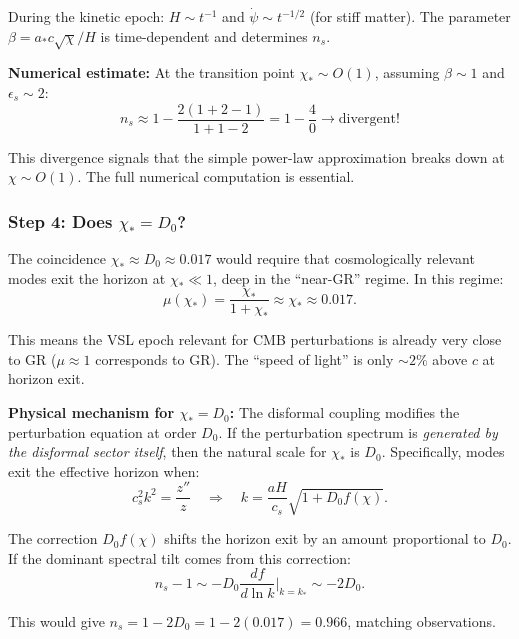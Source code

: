\documentclass[11pt,a4paper]{article}
\begin{document}
During the kinetic epoch: $H \sim t^{-1}$ and $\dot\psi \sim t^{-1/2}$ (for stiff matter). The parameter $\beta = a_* c\sqrt{\chi}/H$ is time-dependent and determines $n_s$.

\textbf{Numerical estimate:} At the transition point $\chi_* \sim O(1)$, assuming $\beta \sim 1$ and $\epsilon_s \sim 2$:
\begin{equation}
n_s \approx 1 - \frac{2(1 + 2 - 1)}{1 + 1 - 2} = 1 - \frac{4}{0} \to \text{divergent!}
\end{equation}

This divergence signals that the simple power-law approximation breaks down at $\chi \sim O(1)$. The full numerical computation is essential.

\subsubsection{Step 4: Does $\chi_* = D_0$?}

The coincidence $\chi_* \approx D_0 \approx 0.017$ would require that cosmologically relevant modes exit the horizon at $\chi_* \ll 1$, deep in the ``near-GR'' regime. In this regime:
\begin{equation}
\mu(\chi_*) = \frac{\chi_*}{1+\chi_*} \approx \chi_* \approx 0.017.
\end{equation}

This means the VSL epoch relevant for CMB perturbations is already very close to GR ($\mu \approx 1$ corresponds to GR). The ``speed of light'' is only $\sim 2\%$ above $c$ at horizon exit.

\textbf{Physical mechanism for $\chi_* = D_0$:} The disformal coupling modifies the perturbation equation at order $D_0$. If the perturbation spectrum is \emph{generated by the disformal sector itself}, then the natural scale for $\chi_*$ is $D_0$. Specifically, modes exit the effective horizon when:
\begin{equation}
c_s^2 k^2 = \frac{z''}{z} \quad \Rightarrow \quad k = \frac{aH}{c_s}\sqrt{1 + D_0 f(\chi)}.
\end{equation}

The correction $D_0 f(\chi)$ shifts the horizon exit by an amount proportional to $D_0$. If the dominant spectral tilt comes from this correction:
\begin{equation}
n_s - 1 \sim -D_0 \frac{d f}{d\ln k}\bigg|_{k=k_*} \sim -2D_0.
\end{equation}

This would give $n_s = 1 - 2D_0 = 1 - 2(0.017) = 0.966$, matching observations.
\end{document}
